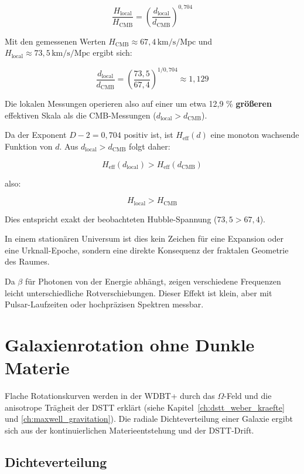 \[
\frac{H_{\text{local}}}{H_{\text{CMB}}} = \left( \frac{d_{\text{local}}}{d_{\text{CMB}}} \right)^{0,704}
\]

Mit den gemessenen Werten \( H_{\text{CMB}} \approx 67,4 \, \text{km/s/Mpc} \) und \( H_{\text{local}} \approx 73,5 \, \text{km/s/Mpc} \) ergibt sich:

\[
\frac{d_{\text{local}}}{d_{\text{CMB}}} = \left( \frac{73,5}{67,4} \right)^{1/0,704} \approx 1,129
\]

Die lokalen Messungen operieren also auf einer um etwa 12,9 \% \textbf{größeren} effektiven Skala als die CMB-Messungen (\( d_{\text{local}} > d_{\text{CMB}} \)).

Da der Exponent \( D-2 = 0,704 \) positiv ist, ist \( H_{\text{eff}}(d) \) eine monoton wachsende Funktion von \( d \). Aus \( d_{\text{local}} > d_{\text{CMB}} \) folgt daher:

\[
H_{\text{eff}}(d_{\text{local}}) > H_{\text{eff}}(d_{\text{CMB}})
\]

also:

\[
H_{\text{local}} > H_{\text{CMB}}
\]

Dies entspricht exakt der beobachteten Hubble-Spannung (\( 73,5 > 67,4 \)).

In einem stationären Universum ist dies kein Zeichen für eine Expansion oder eine Urknall-Epoche, sondern eine direkte Konsequenz der fraktalen Geometrie des Raumes.

Da \( \beta \) für Photonen von der Energie abhängt, zeigen verschiedene Frequenzen leicht unterschiedliche Rotverschiebungen. Dieser Effekt ist klein, aber mit Pulsar-Laufzeiten oder hochpräzisen Spektren messbar.

\section{Galaxienrotation ohne Dunkle Materie}
\label{sec:kosmo_galaxienrotation}

Flache Rotationskurven werden in der WDBT+ durch das \( \Omega \)-Feld und die anisotrope Trägheit der DSTT erklärt (siehe Kapitel~\ref{ch:dstt_weber_kraefte} und \ref{ch:maxwell_gravitation}). Die radiale Dichteverteilung einer Galaxie ergibt sich aus der kontinuierlichen Materieentstehung und der DSTT-Drift.

\subsection{Dichteverteilung}
\label{sub:kosmo_dichte}

